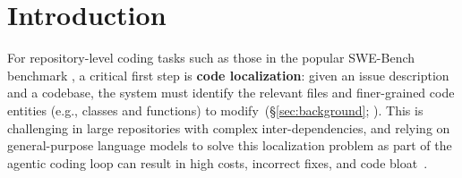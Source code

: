 \section{Introduction}
For repository-level coding tasks such as those in the popular SWE-Bench benchmark \citep{jimenez2024swebenchlanguagemodelsresolve}, a critical first step is \textbf{code localization}: given an issue description and a codebase, the system must identify the relevant files and finer-grained code entities (e.g., classes and functions) to modify~(\S\ref{sec:background}; \citet{husain2019codesearchnet,xia2024agentless}).
This is challenging in large repositories with complex inter-dependencies, and relying on general-purpose language models to solve this localization problem as part of the agentic coding loop can result in high costs, incorrect fixes, and code bloat~\citep{hong2025context}.

